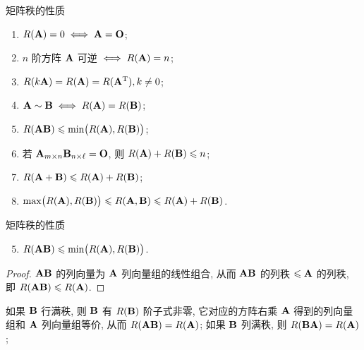 \begin{frame}{矩阵秩的性质}
	\onslide<+->
	\begin{proposition}
		\begin{enumerate}
			\item $R({\mathbf{A}})=0\iff {\mathbf{A}}={\mathbf{O}}$;
			\item $n$ 阶方阵 ${\mathbf{A}}$ 可逆 $\iff R({\mathbf{A}})=n$;
			\item $R(k{\mathbf{A}})=R({\mathbf{A}})=R({\mathbf{A}}^{\mathrm{T}}), k\neq 0$;
			\item ${\mathbf{A}}\sim{\mathbf{B}}\iff R({\mathbf{A}})=R({\mathbf{B}})$;
			\item $R({\mathbf{A}}{\mathbf{B}})\leqslant \min\bigl(R({\mathbf{A}}),R({\mathbf{B}})\bigr)$;
			\item 若 ${\mathbf{A}}_{m\times n}{\mathbf{B}}_{n\times\ell}={\mathbf{O}}$, 则 $R({\mathbf{A}})+R({\mathbf{B}})\leqslant n$;
			\item $R({\mathbf{A}}+{\mathbf{B}})\leqslant R({\mathbf{A}})+R({\mathbf{B}})$;
			\item $\max\bigl(R({\mathbf{A}}),R({\mathbf{B}})\bigr)\leqslant R({\mathbf{A}},{\mathbf{B}})\leqslant R({\mathbf{A}})+R({\mathbf{B}})$.
		\end{enumerate}
	\end{proposition}
\end{frame}


\begin{frame}{矩阵秩的性质}
	\onslide<+->
	\begin{proposition}
		\begin{enumerate}
			\setcounter{enumi}{4}
			\item $R({\mathbf{A}}{\mathbf{B}})\leqslant \min\bigl(R({\mathbf{A}}),R({\mathbf{B}})\bigr)$.
		\end{enumerate}
	\end{proposition}
	\onslide<+->
	\begin{proof}
		${\mathbf{A}}{\mathbf{B}}$ 的列向量为 ${\mathbf{A}}$ 列向量组的线性组合, 从而 ${\mathbf{A}}{\mathbf{B}}$ 的列秩 $\leqslant {\mathbf{A}}$ 的列秩, 即 $R({\mathbf{A}}{\mathbf{B}})\leqslant R({\mathbf{A}})$.
		\onslide<+->{%
			于是
			\[R(\bfA\bfB)=R(\bfB^\rmT\bfA^\rmT)\le R(\bfB^\rmT)=R(\bfB).\qedhere\]
		}
	\end{proof}
	\onslide<+->
	如果 ${\mathbf{B}}$ 行满秩, 则 ${\mathbf{B}}$ 有 $R({\mathbf{B}})$ 阶子式非零, 它对应的方阵右乘 ${\mathbf{A}}$ 得到的列向量组和 ${\mathbf{A}}$ 列向量组等价, 从而 $R({\mathbf{A}}{\mathbf{B}})=R({\mathbf{A}})$;
	如果 ${\mathbf{B}}$ 列满秩, 则 $R({\mathbf{B}}{\mathbf{A}})=R({\mathbf{A}})$;
\end{frame}


